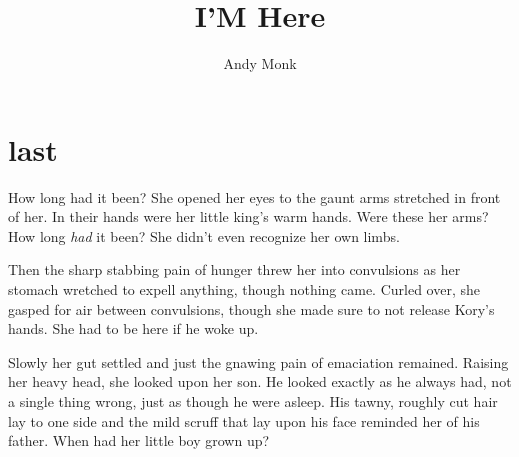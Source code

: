 \documentclass[11pt]{memoir}
\title{I'M Here}
\author{Andy Monk}
\begin{document}
\clearpage
\maketitle
\thispagestyle{empty}



\frontmatter



\mainmatter

\chapter*{last}

How long had it been? She opened her eyes to the gaunt arms stretched in front of her. In their hands were her little king's warm hands. Were these her arms? How long \textit{had} it been? She didn't even recognize her own limbs.

Then the sharp stabbing pain of hunger threw her into convulsions as her stomach wretched to expell anything, though nothing came. Curled over, she gasped for air between convulsions, though she made sure to not release Kory's hands. She had to be here if he woke up.

Slowly her gut settled and just the gnawing pain of emaciation remained. Raising her heavy head, she looked upon her son. He looked exactly as he always had, not a single thing wrong, just as though he were asleep. His tawny, roughly cut hair lay to one side and the mild scruff that lay upon his face reminded her of his father. When had her little boy grown up?


\backmatter
\end{document}
